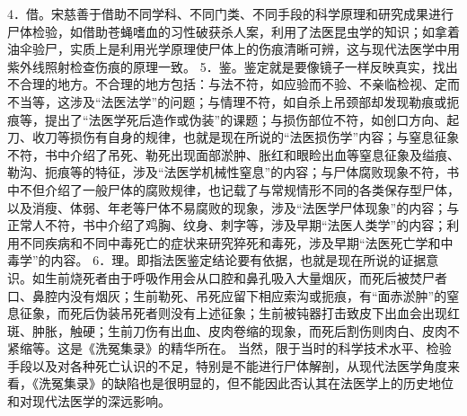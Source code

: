 \documentclass[12pt,UTF8]{ctexbook}
\begin{document}
4．借。宋慈善于借助不同学科、不同门类、不同手段的科学原理和研究成果进行尸体检验，如借助苍蝇嗜血的习性破获杀人案，利用了法医昆虫学的知识；如拿着油伞验尸，实质上是利用光学原理使尸体上的伤痕清晰可辨，这与现代法医学中用紫外线照射检查伤痕的原理一致。
5．鉴。鉴定就是要像镜子一样反映真实，找出不合理的地方。不合理的地方包括：与法不符，如应验而不验、不亲临检视、定而不当等，这涉及“法医法学”的问题；与情理不符，如自杀上吊颈部却发现勒痕或扼痕等，提出了“法医学死后造作或伪装”的课题；与损伤部位不符，如创口方向、起刀、收刀等损伤有自身的规律，也就是现在所说的“法医损伤学”内容；与窒息征象不符，书中介绍了吊死、勒死出现面部淤肿、胀红和眼睑出血等窒息征象及缢痕、勒沟、扼痕等的特征，涉及“法医学机械性窒息”的内容；与尸体腐败现象不符，书中不但介绍了一般尸体的腐败规律，也记载了与常规情形不同的各类保存型尸体，以及消瘦、体弱、年老等尸体不易腐败的现象，涉及“法医学尸体现象”的内容；与正常人不符，书中介绍了鸡胸、纹身、刺字等，涉及早期“法医人类学”的内容；利用不同疾病和不同中毒死亡的症状来研究猝死和毒死，涉及早期“法医死亡学和中毒学”的内容。
6．理。即指法医鉴定结论要有依据，也就是现在所说的证据意识。如生前烧死者由于呼吸作用会从口腔和鼻孔吸入大量烟灰，而死后被焚尸者口、鼻腔内没有烟灰；生前勒死、吊死应留下相应索沟或扼痕，有“面赤淤肿”的窒息征象，而死后伪装吊死者则没有上述征象；生前被钝器打击致皮下出血会出现红斑、肿胀，触硬；生前刀伤有出血、皮肉卷缩的现象，而死后割伤则肉白、皮肉不紧缩等。这是《洗冤集录》的精华所在。
当然，限于当时的科学技术水平、检验手段以及对各种死亡认识的不足，特别是不能进行尸体解剖，从现代法医学角度来看，《洗冤集录》的缺陷也是很明显的，但不能因此否认其在法医学上的历史地位和对现代法医学的深远影响。
\end{document}
